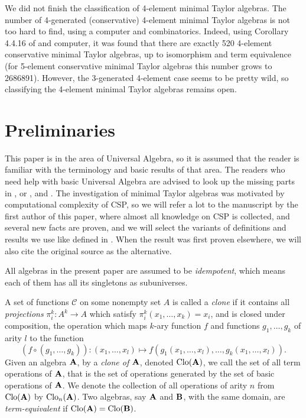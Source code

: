 \documentclass[11pt]{amsart}
\newcommand{\m}[1]{\mathbf{\uppercase{#1}}}
\theoremstyle{definition}
\theoremstyle{remark}
\theoremstyle{plain}
\begin{document}
We did not finish the classification of 4-element minimal Taylor algebras. The number of 4-generated (conservative) 4-element minimal Taylor algebras is not too hard to find, using a computer and combinatorics. Indeed, using Corollary 4.4.16 of \cite{Zebnotes} and computer, it was found that there are exactly 520 4-element conservative minimal Taylor algebras, up to isomorphism and term equivalence (for 5-element conservative minimal Taylor algebras this number grows to 2686891). However, the 3-generated 4-element case seems to be pretty wild, so classifying the 4-element minimal Taylor algebras remains open.



\section{Preliminaries}
This paper is in the area of Universal Algebra, so it is assumed that the reader is familiar with the terminology and basic results of that area. The readers who need help with basic Universal Algebra are advised to look up the missing parts in \cite{burris-sank}, or \cite{alvin1}, \cite{alvin2} and \cite{alvin3}. The investigation of minimal Taylor algebras was motivated by computational complexity of CSP, so we will refer a lot to the manuscript \cite{Zebnotes} by the first author of this paper, where almost all knowledge on CSP is collected, and several new facts are proven, and we will select the variants of definitions and results we use like defined in \cite{Zebnotes}. When the result was first proven elsewhere, we will also cite the original source as the alternative.

All algebras in the present paper are assumed to be \emph{idempotent}, which means each of them has all its singletons as subuniverses. 

A set of functions $\mathcal{C}$ on some nonempty set $A$ is called a \emph{clone} if it contains all \emph{projections} $\pi_i^k\colon A^k\rightarrow A$ which satisfy $\pi_i^k(x_1,\dots,x_k)=x_i$, and is closed under composition, the operation which maps $k$-ary function $f$ and functions $g_1,\dots,g_k$ of arity $l$ to the function $$(f\circ (g_1,\dots,g_k))\colon (x_1,\dots,x_l)\mapsto f(g_1(x_1,\dots,x_l),\dots, g_k(x_1,\dots,x_l)).$$
Given an algebra $\m a$, by a {\emph{clone of $\m a$}}, denoted $\mathrm{Clo}(\m a)$, we call the set of all term operations of $\m a$, that is the set of operations generated by the set of basic operations of $\m a$. We denote the collection of all operations of arity $n$ from $\mathrm{Clo}(\m a)$ by $\mathrm{Clo}_{n}(\m a)$. Two algebras, say $\m a$ and $\m b$, with the same domain, are \emph{term-equivalent} if $\mathrm{Clo}(\m a)=\mathrm{Clo}(\m b)$.
\end{document}
